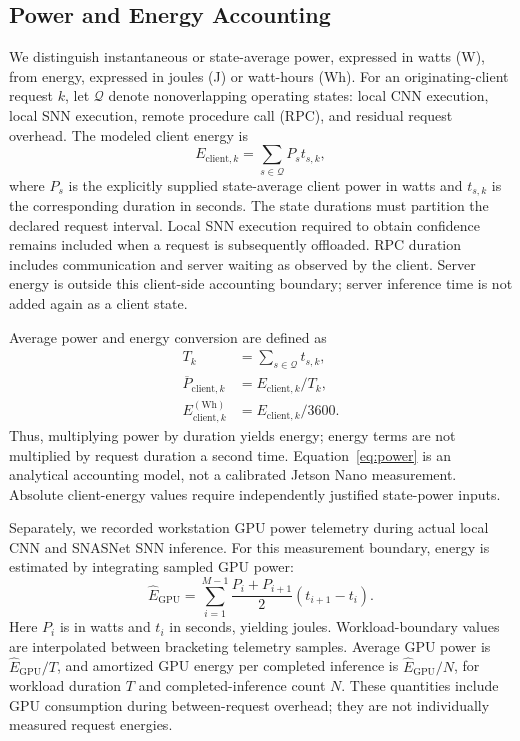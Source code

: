 \documentclass[journal]{IEEEtran}
\begin{document}
\subsection{Power and Energy Accounting}
\label{sec:power_model}

We distinguish instantaneous or state-average power, expressed in watts
(W), from energy, expressed in joules (J) or watt-hours (Wh).
For an originating-client request $k$, let $\mathcal{Q}$ denote
nonoverlapping operating states:
local CNN execution, local SNN execution, remote procedure call (RPC),
and residual request overhead. The modeled client energy is
\begin{equation}
E_{\mathrm{client},k}
=
\sum_{s\in\mathcal{Q}} P_s t_{s,k},
\label{eq:power}
\end{equation}
where $P_s$ is the explicitly supplied state-average client power
in watts and $t_{s,k}$ is the corresponding duration in seconds.
The state durations must partition the declared request interval.
Local SNN execution required to obtain confidence remains included
when a request is subsequently offloaded. RPC duration includes
communication and server waiting as observed by the client.
Server energy is outside this client-side accounting boundary;
server inference time is not added again as a client state.

Average power and energy conversion are defined as
\begin{equation}
\begin{aligned}
T_k &= \sum_{s\in\mathcal{Q}} t_{s,k},\\
\overline{P}_{\mathrm{client},k}
&= E_{\mathrm{client},k}/T_k,\\
E_{\mathrm{client},k}^{(\mathrm{Wh})}
&= E_{\mathrm{client},k}/3600.
\end{aligned}
\label{eq:power_terms}
\end{equation}
Thus, multiplying power by duration yields energy; energy terms
are not multiplied by request duration a second time.
Equation~\eqref{eq:power} is an analytical accounting model, not
a calibrated Jetson Nano measurement. Absolute client-energy
values require independently justified state-power inputs.

Separately, we recorded workstation GPU power telemetry during
actual local CNN and SNASNet SNN inference. For this measurement
boundary, energy is estimated by integrating sampled GPU power:
\begin{equation}
\widehat{E}_{\mathrm{GPU}}
=
\sum_{i=1}^{M-1}
\frac{P_i+P_{i+1}}{2}(t_{i+1}-t_i).
\label{eq:energy}
\end{equation}
Here $P_i$ is in watts and $t_i$ in seconds, yielding joules.
Workload-boundary values are interpolated between bracketing
telemetry samples. Average GPU power is
$\widehat{E}_{\mathrm{GPU}}/T$, and amortized GPU energy per
completed inference is $\widehat{E}_{\mathrm{GPU}}/N$, for workload
duration $T$ and completed-inference count $N$.
These quantities include GPU consumption during between-request
overhead; they are not individually measured request energies.
\end{document}
